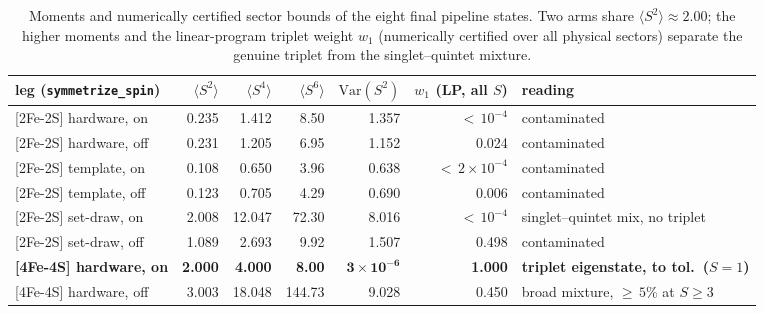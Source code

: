 \documentclass[11pt]{article}
\newcommand{\ssq}{\ensuremath{\langle S^2\rangle}}
\begin{document}
\begin{table}[ht]\centering\small
\caption{Moments and numerically certified sector bounds of the eight final pipeline states. Two arms share $\ssq\approx2.00$; the higher moments and the linear-program triplet weight $w_1$ (numerically certified over all physical sectors) separate the genuine triplet from the singlet--quintet mixture.}
\label{tab:xinstr}
\setlength{\tabcolsep}{4pt}
\begin{tabular}{lrrrrrl}
\toprule
leg (\texttt{symmetrize\_spin}) & \ssq & $\langle S^4\rangle$ & $\langle S^6\rangle$ & $\mathrm{Var}(S^2)$ & $w_1$ (LP, all $S$) & reading \\
\midrule
{[2Fe-2S]} hardware, on & 0.235 & 1.412 & 8.50 & 1.357 & ${<}\,10^{-4}$ & contaminated \\
{[2Fe-2S]} hardware, off & 0.231 & 1.205 & 6.95 & 1.152 & 0.024 & contaminated \\
{[2Fe-2S]} template, on & 0.108 & 0.650 & 3.96 & 0.638 & ${<}\,2\times10^{-4}$ & contaminated \\
{[2Fe-2S]} template, off & 0.123 & 0.705 & 4.29 & 0.690 & 0.006 & contaminated \\
{[2Fe-2S]} set-draw, on & 2.008 & 12.047 & 72.30 & 8.016 & ${<}\,10^{-4}$ & singlet--quintet mix, no triplet \\
{[2Fe-2S]} set-draw, off & 1.089 & 2.693 & 9.92 & 1.507 & 0.498 & contaminated \\
\textbf{{[4Fe-4S]} hardware, on} & \textbf{2.000} & \textbf{4.000} & \textbf{8.00} & $\mathbf{3\times10^{-6}}$ & \textbf{1.000} & \textbf{triplet eigenstate, to tol.\ ($S=1$)} \\
{[4Fe-4S]} hardware, off & 3.003 & 18.048 & 144.73 & 9.028 & 0.450 & broad mixture, ${\ge}\,5\%$ at $S\ge3$ \\
\bottomrule
\end{tabular}
\end{table}
\end{document}
